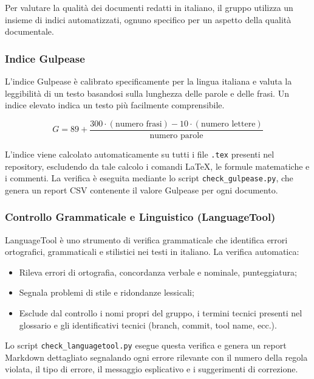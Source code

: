 \documentclass[a4paper,11pt,oneside]{scrartcl}
\begin{document}
Per valutare la qualità dei documenti redatti in italiano, il gruppo utilizza un insieme di indici automatizzati, ognuno specifico per un aspetto della qualità documentale.

\subsubsection{Indice Gulpease}

L'indice Gulpease{\scriptsize{}} è calibrato specificamente per la lingua italiana e valuta la leggibilità di un testo basandosi sulla lunghezza delle parole e delle frasi. Un indice elevato indica un testo più facilmente comprensibile.

\[
G = 89 + \frac{300 \cdot (\text{numero frasi}) - 10 \cdot (\text{numero lettere})}{\text{numero parole}}
\]

L'indice viene calcolato automaticamente su tutti i file \texttt{.tex} presenti nel repository{\scriptsize{}}, escludendo da tale calcolo i comandi \LaTeX{}{\scriptsize{}}, le formule matematiche e i commenti. La verifica è eseguita mediante lo script \texttt{check\_gulpease.py}, che genera un report CSV contenente il valore Gulpease per ogni documento.

\subsubsection{Controllo Grammaticale e Linguistico (LanguageTool)}

LanguageTool è uno strumento di verifica grammaticale che identifica errori ortografici, grammaticali e stilistici nei testi in italiano. La verifica automatica:

\begin{itemize}
    \item Rileva errori di ortografia, concordanza verbale e nominale, punteggiatura;
    \item Segnala problemi di stile e ridondanze lessicali;
    \item Esclude dal controllo i nomi propri del gruppo, i termini tecnici presenti nel glossario e gli identificativi tecnici (branch, commit, tool name, ecc.).
\end{itemize}

Lo script \texttt{check\_languagetool.py} esegue questa verifica e genera un report Markdown dettagliato segnalando ogni errore rilevante con il numero della regola violata, il tipo di errore, il messaggio esplicativo e i suggerimenti di correzione.
\end{document}
